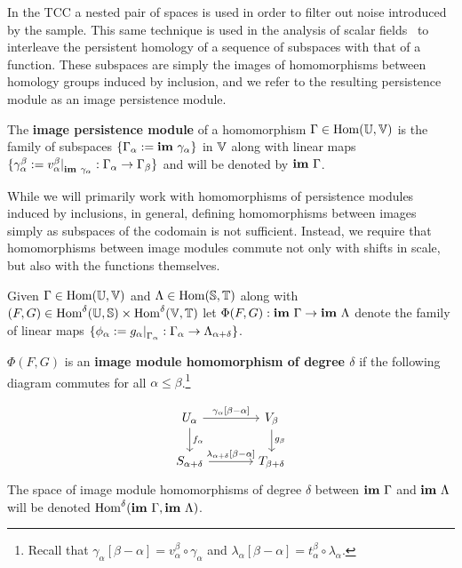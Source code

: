 
In the TCC a nested pair of spaces is used in order to filter out noise introduced by the sample.
This same technique is used in the analysis of scalar fields~\cite{chazal09analysis} to interleave the persistent homology of a sequence of subspaces with that of a function.
These subspaces are simply the images of homomorphisms between homology groups induced by inclusion, and we refer to the resulting persistence module as an image persistence module.

\begin{definition}
  The \textbf{image persistence module} of a homomorphism $\Gamma\in\mathrm{Hom}(\mathbb{U},\mathbb{V})$ is the family of subspaces $\{\Gamma_\alpha :=\mathbf{im}~\gamma_\alpha\}$ in $\mathbb{V}$ along with linear maps $\{\gamma_\alpha^\beta := v_\alpha^\beta\mathord{\mid}_{\mathbf{im}~\gamma_\alpha} : \Gamma_\alpha\to\Gamma_\beta\}$ and will be denoted by $\mathbf{im}~\Gamma$.
\end{definition}

While we will primarily work with homomorphisms of persistence modules induced by inclusions, in general, defining homomorphisms between images simply as subspaces of the codomain is not sufficient.
Instead, we require that homomorphisms between image modules commute not only with shifts in scale, but also with the functions themselves.

\begin{definition}
  Given $\Gamma\in\mathrm{Hom}(\mathbb{U},\mathbb{V})$ and $\Lambda\in\mathrm{Hom}(\mathbb{S},\mathbb{T})$ along with $(F,G)\in\mathrm{Hom}^\delta(\mathbb{U},\mathbb{S})\times\mathrm{Hom}^\delta(\mathbb{V},\mathbb{T})$ let $\Phi(F, G) : \mathbf{im}~\Gamma\to\mathbf{im}~\Lambda$ denote the family of linear maps $\{\phi_\alpha := g_\alpha\mathord{\mid}_{\Gamma_\alpha} : \Gamma_\alpha\to\Lambda_{\alpha+\delta}\}$.

  $\Phi(F, G)$ is an \textbf{image module homomorphism of degree $\delta$} if the following diagram commutes for all $\alpha\leq\beta$.\footnote{Recall that $\gamma_\alpha[\beta-\alpha] = v_\alpha^\beta\circ\gamma_\alpha$ and $\lambda_\alpha[\beta-\alpha] = t_\alpha^\beta\circ\lambda_\alpha$.}

  \begin{equation}\label{dgm:image_homomorphism}
    \begin{tikzcd}[column sep=large]
        U_\alpha\arrow{r}{\gamma_\alpha[\beta-\alpha]}\arrow{d}{f_\alpha} &
      V_\beta\arrow{d}{g_\beta}\\
      S_{\alpha+\delta}\arrow{r}{\lambda_{\alpha+\delta}[\beta-\alpha]} &
      T_{\beta +\delta}
  \end{tikzcd}\end{equation}
  The space of image module homomorphisms of degree $\delta$ between $\mathbf{im}~\Gamma$ and $\mathbf{im}~\Lambda$ will be denoted $\mathrm{Hom}^\delta(\mathbf{im}~\Gamma,\mathbf{im}~\Lambda)$.
\end{definition}

